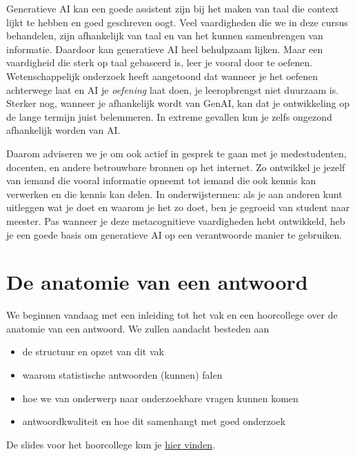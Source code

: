 \documentclass[
  letterpaper,
  DIV=11,
  numbers=noendperiod]{scrreprt}
\providecommand{\tightlist}{%
  \setlength{\itemsep}{0pt}\setlength{\parskip}{0pt}}
\begin{document}
Generatieve AI kan een goede assistent zijn bij het maken van taal die
context lijkt te hebben en goed geschreven oogt. Veel vaardigheden die
we in deze cursus behandelen, zijn afhankelijk van taal en van het
kunnen samenbrengen van informatie. Daardoor kan generatieve AI heel
behulpzaam lijken. Maar een vaardigheid die sterk op taal gebaseerd is,
leer je vooral door te oefenen. Wetenschappelijk onderzoek heeft
aangetoond dat wanneer je het oefenen achterwege laat en AI je
\emph{oefening} laat doen, je leeropbrengst niet duurzaam is. Sterker
nog, wanneer je afhankelijk wordt van GenAI, kan dat je ontwikkeling op
de lange termijn juist belemmeren. In extreme gevallen kun je zelfs
ongezond afhankelijk worden van AI.

Daarom adviseren we je om ook actief in gesprek te gaan met je
medestudenten, docenten, en andere betrouwbare bronnen op het internet.
Zo ontwikkel je jezelf van iemand die vooral informatie opneemt tot
iemand die ook kennis kan verwerken en die kennis kan delen. In
onderwijstermen: als je aan anderen kunt uitleggen wat je doet en waarom
je het zo doet, ben je gegroeid van student naar meester. Pas wanneer je
deze metacognitieve vaardigheden hebt ontwikkeld, heb je een goede basis
om generatieve AI op een verantwoorde manier te gebruiken.


\chapter{De anatomie van een antwoord}\label{sec-mt1}

\begin{tcolorbox}[enhanced jigsaw, arc=.35mm, bottomrule=.15mm, bottomtitle=1mm, breakable, colback=white, colbacktitle=quarto-callout-tip-color!10!white, colframe=quarto-callout-tip-color-frame, coltitle=black, left=2mm, leftrule=.75mm, opacityback=0, opacitybacktitle=0.6, rightrule=.15mm, title=\textcolor{quarto-callout-tip-color}{\faLightbulb}\hspace{0.5em}{Hoorcollege 15 juni 2026}, titlerule=0mm, toprule=.15mm, toptitle=1mm]

We beginnen vandaag met een inleiding tot het vak en een hoorcollege
over de anatomie van een antwoord. We zullen aandacht besteden aan

\begin{itemize}
\tightlist
\item
  de structuur en opzet van dit vak
\item
  waarom statistische antwoorden (kunnen) falen
\item
  hoe we van onderwerp naar onderzoekbare vragen kunnen komen
\item
  antwoordkwaliteit en hoe dit samenhangt met goed onderzoek
\end{itemize}

De slides voor het hoorcollege kun je \href{slides/lec-1.html}{hier
vinden}.

\end{tcolorbox}
\end{document}
